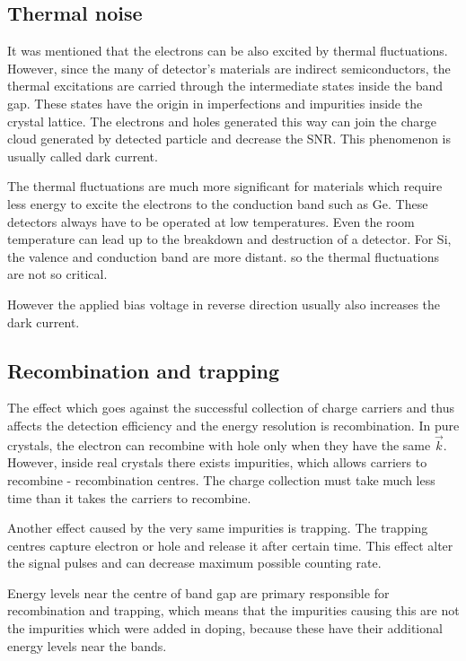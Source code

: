 \subsection{Thermal noise}

It was mentioned that the electrons can be also excited by thermal fluctuations. However, since the many of detector's materials are indirect semiconductors, the thermal excitations are carried through the intermediate states inside the band gap. These states have the origin in imperfections and impurities inside the crystal lattice. The electrons and holes generated this way can join the charge cloud generated by detected particle and decrease the SNR. This phenomenon is usually called dark current.

\par
The thermal fluctuations are much more significant for materials which require less energy to excite the electrons to the conduction band such as Ge. These detectors always have to be operated at low temperatures. Even the room temperature can lead up to the breakdown and destruction of a detector. For Si, the valence and conduction band are more distant. so the thermal fluctuations are not so critical.
\par
However the applied bias voltage in reverse direction usually also increases the dark current.


\subsection{Recombination and trapping}
The effect which goes against the successful collection of charge carriers and thus affects the detection efficiency and the energy resolution is recombination. In pure crystals, the electron can recombine with hole only when they have the same $\vec{k}$. However, inside real crystals there exists impurities, which allows carriers to recombine - recombination centres. The charge collection must take much less time than it takes the carriers to recombine. 
\par
Another effect caused by the very same impurities is trapping. The trapping centres capture electron or hole and release it after certain time. This effect alter the signal pulses and can decrease maximum possible counting rate.
\par
Energy levels near the centre of band gap are primary responsible for recombination and trapping, which means that the impurities causing this are not the impurities which were added in doping, because these have their additional energy levels near the bands. 



